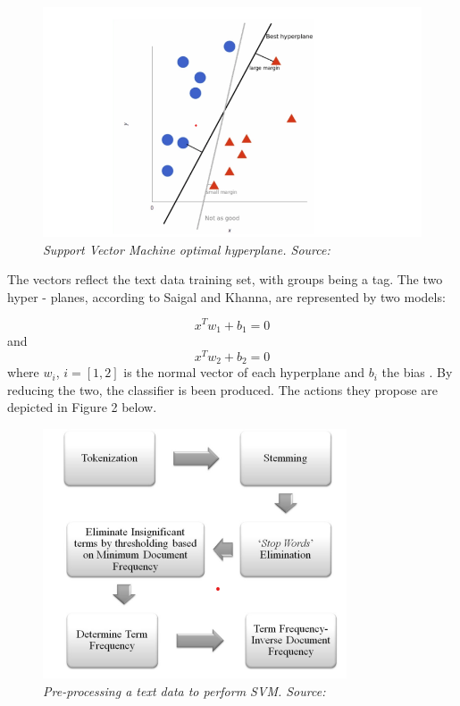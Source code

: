 \documentclass[a4paper]{article}
\begin{document}
\begin{figure}[tb]
\includegraphics[width=1\columnwidth]{img1.png}
\caption{{\it Support Vector Machine optimal hyperplane. Source: \cite{ES3}}}
\label{spprod}
\end{figure}

The vectors reflect the text data training set, with groups being a tag. The two hyper - planes, according to Saigal and Khanna, are represented by two models:

$$
x^{T} w_{1}+b_{1}=0
$$
and
$$
x^{T} w_{2}+b_{2}=0
$$
where $w_{i}$, $i = [1,2]$ is the normal vector of each hyperplane and $b_{i}$ the bias \cite{ES7}. By reducing the two, the classifier is been produced. The actions they propose are depicted in Figure 2 below.

\begin{figure}[tb]
\includegraphics[width=1\columnwidth]{img2.png}
\caption{{\it Pre-processing a text data to perform SVM. Source: \cite{ES7}}}
\label{spprod}
\end{figure}
\end{document}
